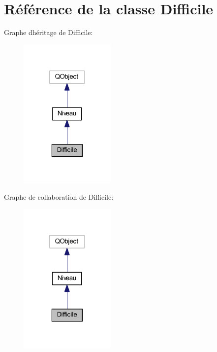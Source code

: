 \hypertarget{class_difficile}{}\section{Référence de la classe Difficile}
\label{class_difficile}


Graphe d\textquotesingle{}héritage de Difficile\+:
\nopagebreak
\begin{figure}[H]
\begin{center}
\leavevmode
\includegraphics[width=133pt]{class_difficile__inherit__graph}
\end{center}
\end{figure}


Graphe de collaboration de Difficile\+:
\nopagebreak
\begin{figure}[H]
\begin{center}
\leavevmode
\includegraphics[width=133pt]{class_difficile__coll__graph}
\end{center}
\end{figure}
